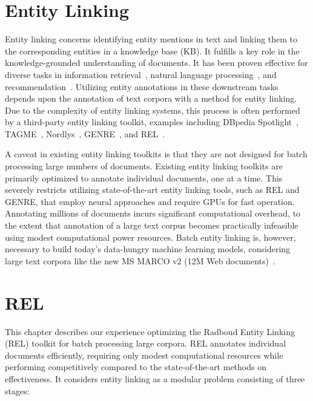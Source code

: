 \section{Entity Linking}
Entity linking concerns identifying entity mentions in text and linking them to the corresponding entities in a knowledge base (KB). It fulfills a key role in the knowledge-grounded understanding of documents. It has been proven effective for diverse tasks in information retrieval~\cite{Gerritse:2022:EMBERT, Gerritse:2020:GEER, doc-ranking-entity, el-ranking-hasibi, el-balog, query-recommendation-entity, chatterjee2022bert}, natural language processing~\cite{lin-etal-2012-entity, watson}, and recommendation~\cite{yang-etal-2018-collective}.
Utilizing entity annotations in these downstream tasks depends upon the annotation of text corpora with a method for entity linking. Due to the complexity of entity linking systems, this process is often performed by a third-party entity linking toolkit, examples including DBpedia Spotlight~\cite{dbpedia-spotlight}, TAGME~\cite{tagme}, Nordlys~\cite{nordlys}, GENRE~\cite{genre}, and REL~\cite{REL}. 

A caveat in existing entity linking toolkits is that they are not designed for batch processing large numbers of documents. Existing entity linking toolkits are primarily optimized to annotate individual documents, one at a time. This severely restricts utilizing state-of-the-art entity linking tools, such as REL and GENRE, that employ neural approaches and require GPUs for fast operation. Annotating millions of documents incurs significant computational overhead, to the extent that annotation of a large text corpus becomes practically infeasible using modest computational power resources. Batch entity linking is, however, necessary to build today's data-hungry machine learning models, considering large text corpora like the new MS MARCO v2 (12M Web documents)~\cite{msmarco}.

\section{REL}
This chapter describes our experience optimizing the Radboud Entity Linking (REL) toolkit for batch processing large corpora. REL annotates individual documents efficiently, requiring only modest computational resources while performing competitively compared to the state-of-the-art methods on effectiveness. It considers entity linking as a modular problem consisting of three stages: 

